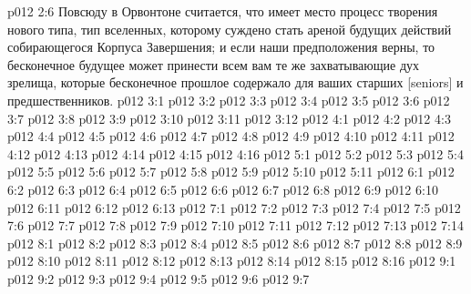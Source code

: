 \vs p012 2:6 Повсюду в Орвонтоне считается, что имеет место процесс творения нового типа, тип вселенных, которому суждено стать ареной будущих действий собирающегося Корпуса Завершения; и если наши предположения верны, то бесконечное будущее может принести всем вам те же захватывающие дух зрелища, которые бесконечное прошлое содержало для ваших старших [seniors] и предшественников.
\vs p012 3:1 
\vs p012 3:2 
\vs p012 3:3 
\vs p012 3:4 
\vs p012 3:5 
\vs p012 3:6 \pc 
\vs p012 3:7 
\vs p012 3:8 
\vs p012 3:9 
\vs p012 3:10 
\vs p012 3:11 
\vs p012 3:12 \pc 
{}
\vs p012 4:1 
\vs p012 4:2 
\vs p012 4:3 
\vs p012 4:4 
\vs p012 4:5 
\vs p012 4:6 \pc 
\vs p012 4:7 \pc 
\vs p012 4:8 
\vs p012 4:9 
\vs p012 4:10 
\vs p012 4:11 
\vs p012 4:12 \pc 
\vs p012 4:13 
\vs p012 4:14 \pc 
\vs p012 4:15 
\vs p012 4:16 
\vs p012 5:1 
\vs p012 5:2 
\vs p012 5:3 \pc 
\vs p012 5:4 
\vs p012 5:5 \pc 
\vs p012 5:6 \pc 
\vs p012 5:7 
\vs p012 5:8 
\vs p012 5:9 
\vs p012 5:10 \pc 
\vs p012 5:11 
\vs p012 6:1 
\vs p012 6:2 
\vs p012 6:3 
\vs p012 6:4 
\vs p012 6:5 
\vs p012 6:6 \pc 
\vs p012 6:7 
\vs p012 6:8 \pc 
\vs p012 6:9 
\vs p012 6:10 
\vs p012 6:11 
\vs p012 6:12 
\vs p012 6:13 \pc 
{}
\vs p012 7:1 
\vs p012 7:2 \pc 
\vs p012 7:3 
\vs p012 7:4 
\vs p012 7:5 
\vs p012 7:6 
\vs p012 7:7 \pc 
\vs p012 7:8 
\vs p012 7:9 
\vs p012 7:10 
\vs p012 7:11 
\vs p012 7:12 \pc 
\vs p012 7:13 \pc 
\vs p012 7:14 
\vs p012 8:1 
\vs p012 8:2 \pc 
\vs p012 8:3 
\vs p012 8:4 \pc 
\vs p012 8:5 
\vs p012 8:6 \pc 
\vs p012 8:7 
\vs p012 8:8 
\vs p012 8:9 \pc 
\vs p012 8:10 
\vs p012 8:11 
\vs p012 8:12 
\vs p012 8:13 \pc 
\vs p012 8:14 \pc 
\vs p012 8:15 
\vs p012 8:16 
\vs p012 9:1 
\vs p012 9:2 \pc 
\vs p012 9:3 
\vs p012 9:4 
\vs p012 9:5 
\vs p012 9:6 \pc 
\vsetoff
\vs p012 9:7 
\quizlink
